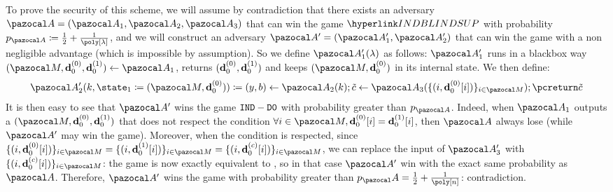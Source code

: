 \begin{proofE}
  To prove the security of this scheme, we will assume by contradiction that there exists an adversary $\cA = (\cA_1, \cA_2, \cA_3)$ that can win the game $\INDBLINDSUP{}$ with probability $p_{\cA} \eqdef \frac{1}{2} + \frac{1}{\poly[\lambda]}$, and we will construct an adversary $\cA' = (\cA'_1, \cA'_2)$ that can win the game \INDBLIND{} with a non negligible advantage (which is impossible by assumption). So we define $\cA'_1(\lambda)$ as follows: $\cA'_1$ runs in a blackbox way $(\cM, \vect{d}_0^{(0)},\vect{d}_0^{(1)}) \gets \cA_1$, returns $(\mathbf{d}_0^{(0)},\mathbf{d}_0^{(1)})$ and keeps $(\cM, \vect{d}_0^{(0)})$ in its internal state. We then define:
  \begin{align}
    \cA'_2(k, \state_1 \eqdef (\cM, \vect{d}_0^{(0)})) \eqdef (y,b) \leftarrow \cA_2(k); \tilde{c} \gets \cA_3(\{(i, \vect{d}_0^{(0)}[i])\}_{i \in \cM}); \pcreturn \tilde{c}
  \end{align}
  It is then easy to see that $\cA'$ wins the game $ {\tt IND-D0} $ with probability greater than $p_{\cA}$. Indeed, when $\cA_1$ outputs a $(\cM, \vect{d}_0^{(0)},\vect{d}_0^{(1)})$ that does not respect the condition $\forall i \in \cM, \vect{d}_0^{(0)}[i] = \vect{d}_0^{(1)}[i]$, then $\cA$ always lose (while $\cA'$ may win the game). Moreover, when the condition is respected, since $\{(i, \vect{d}_0^{(0)}[i])\}_{i \in \cM} = \{(i, \vect{d}_0^{(1)}[i])\}_{i \in \cM} = \{(i, \vect{d}_0^{(c)}[i])\}_{i \in \cM}$, we can replace the input of $\cA'_3$ with $\{(i, \vect{d}_0^{(c)}[i])\}_{i \in \cM}$: the game is now exactly equivalent to \INDBLINDSUP{}, so in that case $\cA'$ win with the exact same probability as $\cA$. Therefore, $\cA'$ wins the game \INDFCT{} with probability greater than $p_\cA = \frac{1}{2} + \frac{1}{\poly[n]}$: contradiction.
\end{proofE}


